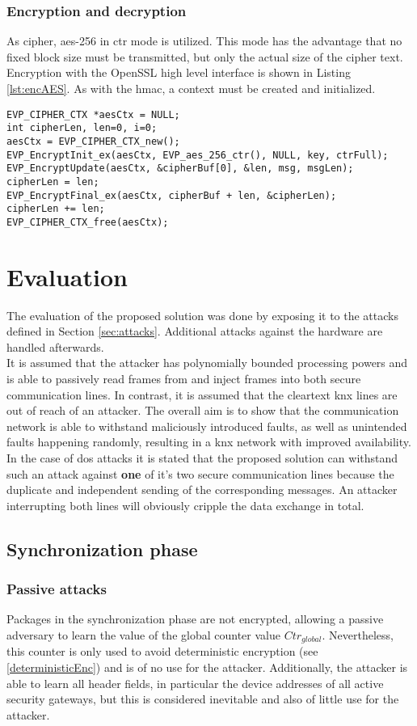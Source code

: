 \subsubsection{Encryption and decryption}
As cipher, \gls{aes}-256 in \gls{ctr} mode is utilized. This mode has the advantage that no fixed block size must be transmitted, but only the actual size of the cipher text.
Encryption with the OpenSSL high level interface is shown in Listing \ref{lst:encAES}. As with the \gls{hmac}, a context must be created and initialized.

\begin{lstlisting}[style=cStyle,caption={\gls{aes} encryption},label=lst:encAES]
EVP_CIPHER_CTX *aesCtx = NULL;
int cipherLen, len=0, i=0;
aesCtx = EVP_CIPHER_CTX_new();
EVP_EncryptInit_ex(aesCtx, EVP_aes_256_ctr(), NULL, key, ctrFull);
EVP_EncryptUpdate(aesCtx, &cipherBuf[0], &len, msg, msgLen);
cipherLen = len;
EVP_EncryptFinal_ex(aesCtx, cipherBuf + len, &cipherLen);
cipherLen += len;
EVP_CIPHER_CTX_free(aesCtx);
\end{lstlisting}

\section{Evaluation}
The evaluation of the proposed solution was done by exposing it to the attacks defined in Section \ref{sec:attacks}. Additional attacks against the hardware are handled afterwards.
\\
It is assumed that the attacker has polynomially bounded processing
powers and is able to passively read frames from and inject frames into both secure communication lines. In contrast, it is assumed that the cleartext \gls{knx} lines are out 
of reach of an attacker.
The overall aim is to show that the communication network is able to withstand maliciously introduced faults, as well as unintended faults happening randomly, resulting
in a \gls{knx} network with improved availability. In the case of \gls{dos} attacks it is stated that the proposed solution can withstand such an attack against \textbf{one} of it's
two secure communication lines because the duplicate and independent sending of the corresponding messages. An attacker interrupting both lines will obviously cripple the 
data exchange in total. 

\subsection{Synchronization phase}
\subsubsection{Passive attacks}
Packages in the synchronization phase are not encrypted, allowing a passive adversary to learn the value of the global counter value $Ctr_{global}$. Nevertheless,
this counter is only used to avoid deterministic encryption (see \ref{deterministicEnc}) and is of no use for the attacker.
Additionally, the attacker is able to learn all header fields, in particular the device addresses of all active security gateways, but this is considered inevitable and also of little
use for the attacker.

